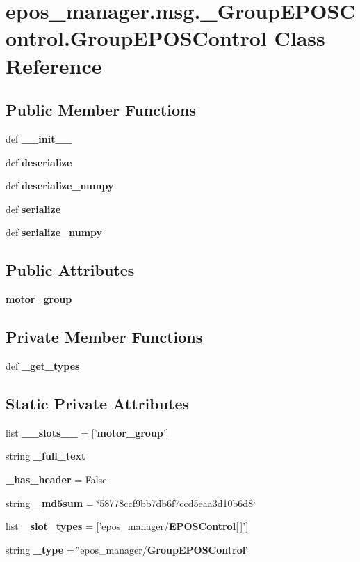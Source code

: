 \section{epos\-\_\-manager.\-msg.\-\_\-\-Group\-E\-P\-O\-S\-Control.\-Group\-E\-P\-O\-S\-Control \-Class \-Reference}
\label{classepos__manager_1_1msg_1_1__GroupEPOSControl_1_1GroupEPOSControl}
\subsection*{\-Public \-Member \-Functions}
\begin{DoxyCompactItemize}
\item 
def {\bf \-\_\-\-\_\-init\-\_\-\-\_\-}
\item 
def {\bf deserialize}
\item 
def {\bf deserialize\-\_\-numpy}
\item 
def {\bf serialize}
\item 
def {\bf serialize\-\_\-numpy}
\end{DoxyCompactItemize}
\subsection*{\-Public \-Attributes}
\begin{DoxyCompactItemize}
\item 
{\bf motor\-\_\-group}
\end{DoxyCompactItemize}
\subsection*{\-Private \-Member \-Functions}
\begin{DoxyCompactItemize}
\item 
def {\bf \-\_\-get\-\_\-types}
\end{DoxyCompactItemize}
\subsection*{\-Static \-Private \-Attributes}
\begin{DoxyCompactItemize}
\item 
list {\bf \-\_\-\-\_\-slots\-\_\-\-\_\-} = ['{\bf motor\-\_\-group}']
\item 
string {\bf \-\_\-full\-\_\-text}
\item 
{\bf \-\_\-has\-\_\-header} = \-False
\item 
string {\bf \-\_\-md5sum} = \char`\"{}58778ccf9bb7db6f7ccd5eaa3d10b6d8\char`\"{}
\item 
list {\bf \-\_\-slot\-\_\-types} = ['epos\-\_\-manager/{\bf \-E\-P\-O\-S\-Control}[$\,$]']
\item 
string {\bf \-\_\-type} = \char`\"{}epos\-\_\-manager/{\bf \-Group\-E\-P\-O\-S\-Control}\char`\"{}
\end{DoxyCompactItemize}


